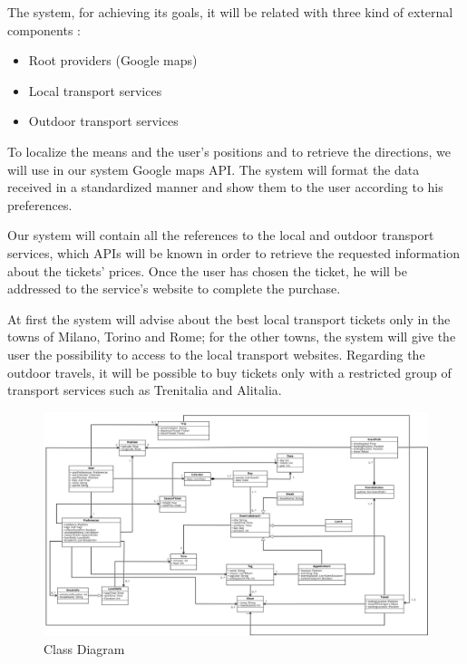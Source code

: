 \vspace*{-5mm}

The system, for achieving its goals, it will be related with three kind of external components :
\begin{itemize}
	\setlength{\leftskip}{0.5cm}
	\item Root providers (Google maps)
	\item Local transport services
	\item Outdoor transport services
\end{itemize}
To localize the means and the user’s positions and to retrieve the directions, we will use in our system Google maps API. The system will format the data received in a standardized manner and show them to the user according to his preferences.\par
Our system will contain all the references to the local and outdoor transport services, which APIs will be known in order to retrieve the requested information about the tickets’ prices. 
Once the user has chosen the ticket, he will be addressed to the service’s website to complete the purchase.\par
At first the system will advise about the best local transport tickets only in the towns of Milano, Torino and Rome; for the other towns, the system will give the user the possibility to access to the local transport websites.
Regarding the outdoor travels, it will be possible to buy tickets only with a restricted group of transport services such as Trenitalia and Alitalia.
\begin{figure}[H]
	\centering
	\includegraphics[scale=0.25]{Images/Class_Diagram}
	\caption{Class Diagram}
\end{figure}

